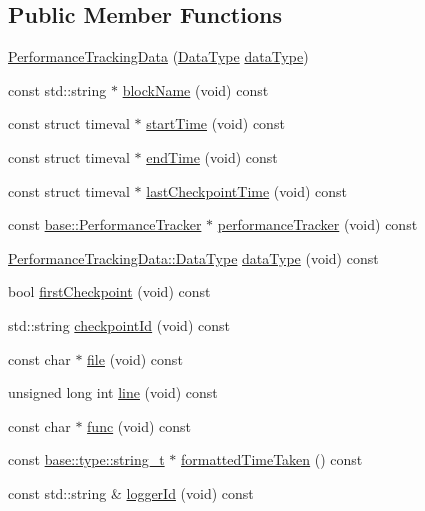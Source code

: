 \subsection*{Public Member Functions}
\begin{DoxyCompactItemize}
\item 
\hyperlink{classel_1_1_performance_tracking_data_afea4cb5328e6fdb27fcf8fc14acbdb40}{Performance\+Tracking\+Data} (\hyperlink{classel_1_1_performance_tracking_data_a1b45d5b1d5e76d0687aaffcf08302f17}{Data\+Type} \hyperlink{classel_1_1_performance_tracking_data_a38dc15a2015be16e23aafd3c36332dbf}{data\+Type})
\item 
const std\+::string $\ast$ \hyperlink{classel_1_1_performance_tracking_data_a929601137dcef83759a563a94ef7aad4}{block\+Name} (void) const 
\item 
const struct timeval $\ast$ \hyperlink{classel_1_1_performance_tracking_data_aeb2462e8a5c9e43a874a5bd441f22a17}{start\+Time} (void) const 
\item 
const struct timeval $\ast$ \hyperlink{classel_1_1_performance_tracking_data_a1828f5f7c3c1d879b73bb090df87dfb8}{end\+Time} (void) const 
\item 
const struct timeval $\ast$ \hyperlink{classel_1_1_performance_tracking_data_af6f072db1ae54343864bc19c2f99c186}{last\+Checkpoint\+Time} (void) const 
\item 
const \hyperlink{classel_1_1base_1_1_performance_tracker}{base\+::\+Performance\+Tracker} $\ast$ \hyperlink{classel_1_1_performance_tracking_data_ad19493aa3f826fdee28b59630ba3ecae}{performance\+Tracker} (void) const 
\item 
\hyperlink{classel_1_1_performance_tracking_data_a1b45d5b1d5e76d0687aaffcf08302f17}{Performance\+Tracking\+Data\+::\+Data\+Type} \hyperlink{classel_1_1_performance_tracking_data_a38dc15a2015be16e23aafd3c36332dbf}{data\+Type} (void) const 
\item 
bool \hyperlink{classel_1_1_performance_tracking_data_a5bf01d3c580627a9a564cc6043275287}{first\+Checkpoint} (void) const 
\item 
std\+::string \hyperlink{classel_1_1_performance_tracking_data_a17c92b7a9ea243eb37f3fa903ce6e06d}{checkpoint\+Id} (void) const 
\item 
const char $\ast$ \hyperlink{classel_1_1_performance_tracking_data_a51512448de4eb220514f193a2fc14849}{file} (void) const 
\item 
unsigned long int \hyperlink{classel_1_1_performance_tracking_data_a82529dd8d0c92bf377ec269cb4f69a45}{line} (void) const 
\item 
const char $\ast$ \hyperlink{classel_1_1_performance_tracking_data_a12fe4fe91e83cbff7d5bb4736176ec30}{func} (void) const 
\item 
const \hyperlink{namespaceel_1_1base_1_1type_a67e406cd213c231f1d135b5a4eda64b5}{base\+::type\+::string\+\_\+t} $\ast$ \hyperlink{classel_1_1_performance_tracking_data_a44a4c82d400155bd147eb455025c88fc}{formatted\+Time\+Taken} () const 
\item 
const std\+::string \& \hyperlink{classel_1_1_performance_tracking_data_ae8ad846d155762ae7cab3fb67760f5a1}{logger\+Id} (void) const 
\end{DoxyCompactItemize}
